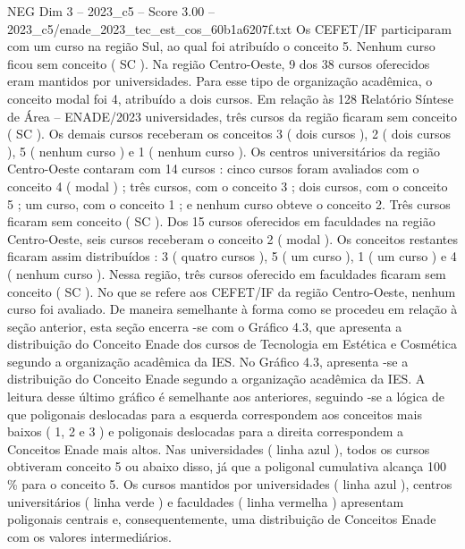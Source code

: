 \begin{textsample}{NEG Dim 3 – 2023\_c5 – Score 3.00 – 2023\_c5/enade\_2023\_tec\_est\_cos\_60b1a6207f.txt}
Os CEFET/IF participaram com um curso na região Sul, ao qual foi atribuído o conceito 5.
Nenhum curso ficou sem conceito ( SC ).
Na região Centro-Oeste, 9 dos 38 cursos oferecidos eram mantidos por universidades.
Para esse tipo de organização acadêmica, o conceito modal foi 4, atribuído a dois cursos.
Em relação às 128 Relatório Síntese de Área – ENADE/2023 universidades, três cursos da região ficaram sem conceito ( SC ).
Os demais cursos receberam os conceitos 3 ( dois cursos ), 2 ( dois cursos ), 5 ( nenhum curso ) e 1 ( nenhum curso ).
Os centros universitários da região Centro-Oeste contaram com 14 cursos : cinco cursos foram avaliados com o conceito 4 ( modal ) ; três cursos, com o conceito 3 ; dois cursos, com o conceito 5 ; um curso, com o conceito 1 ; e nenhum curso obteve o conceito 2.
Três cursos ficaram sem conceito ( SC ).
Dos 15 cursos oferecidos em faculdades na região Centro-Oeste, seis cursos receberam o conceito 2 ( modal ).
Os conceitos restantes ficaram assim distribuídos : 3 ( quatro cursos ), 5 ( um curso ), 1 ( um curso ) e 4 ( nenhum curso ).
Nessa região, três cursos oferecido em faculdades ficaram sem conceito ( SC ).
No que se refere aos CEFET/IF da região Centro-Oeste, nenhum curso foi avaliado.
De maneira semelhante à forma como se procedeu em relação à seção anterior, esta seção encerra -se com o Gráfico 4.3, que apresenta a distribuição do Conceito Enade dos cursos de Tecnologia em Estética e Cosmética segundo a organização acadêmica da IES.
No Gráfico 4.3, apresenta -se a distribuição do Conceito Enade segundo a organização acadêmica da IES.
A leitura desse último gráfico é semelhante aos anteriores, seguindo -se a lógica de que poligonais deslocadas para a esquerda correspondem aos conceitos mais baixos ( 1, 2 e 3 ) e poligonais deslocadas para a direita correspondem a Conceitos Enade mais altos.
Nas universidades ( linha azul ), todos os cursos obtiveram conceito 5 ou abaixo disso, já que a poligonal cumulativa alcança 100 \% para o conceito 5.
Os cursos mantidos por universidades ( linha azul ), centros universitários ( linha verde ) e faculdades ( linha vermelha ) apresentam poligonais centrais e, consequentemente, uma distribuição de Conceitos Enade com os valores intermediários.

\end{textsample}
